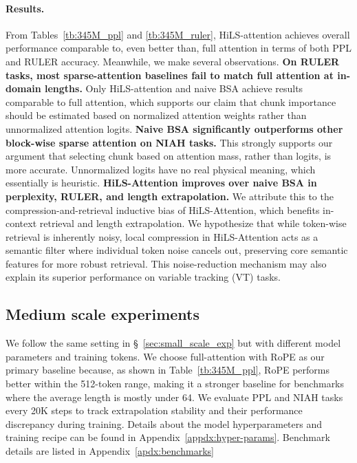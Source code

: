 \paragraph{Results.}
From Tables~\ref{tb:345M_ppl} and \ref{tb:345M_ruler}, HiLS-attention achieves overall performance comparable to, even better than, full attention in terms of both PPL and RULER accuracy. Meanwhile, we make several observations. \textbf{On RULER tasks, most sparse-attention baselines fail to match full attention at in-domain lengths.} Only HiLS-attention and naive BSA achieve results comparable to full attention, which supports our claim that chunk importance should be estimated based on normalized attention weights rather than unnormalized attention logits.
\textbf{Naive BSA significantly outperforms other block-wise sparse attention on NIAH tasks.}
This strongly supports our argument that selecting chunk based on attention mass, rather than logits, is more accurate. Unnormalized logits have no real physical meaning, which essentially is heuristic.
\textbf{HiLS-Attention improves over naive BSA in perplexity, RULER, and length extrapolation.}
We attribute this to the compression-and-retrieval inductive bias of HiLS-Attention, which benefits in-context retrieval and length extrapolation. We hypothesize that while token-wise retrieval is inherently noisy, local compression in HiLS-Attention acts as a semantic filter where individual token noise cancels out, preserving core semantic features for more robust retrieval. This noise-reduction mechanism may also explain its superior performance on variable tracking (VT) tasks.



\subsection{Medium scale experiments}
We follow the same setting in \S~\ref{sec:small_scale_exp} but with different model parameters and training tokens. 
We choose full-attention with RoPE as our primary baseline because, as shown in Table~\ref{tb:345M_ppl}, RoPE performs better within the 512-token range, making it a stronger baseline for benchmarks where the average length is mostly under 64. We evaluate PPL and NIAH tasks every 20K steps to track extrapolation stability and their performance discrepancy during training. Details about the model hyperparameters and training recipe can be found in Appendix~\ref{appdx:hyper-params}. Benchmark details are listed in Appendix~\ref{apdx:benchmarks}


